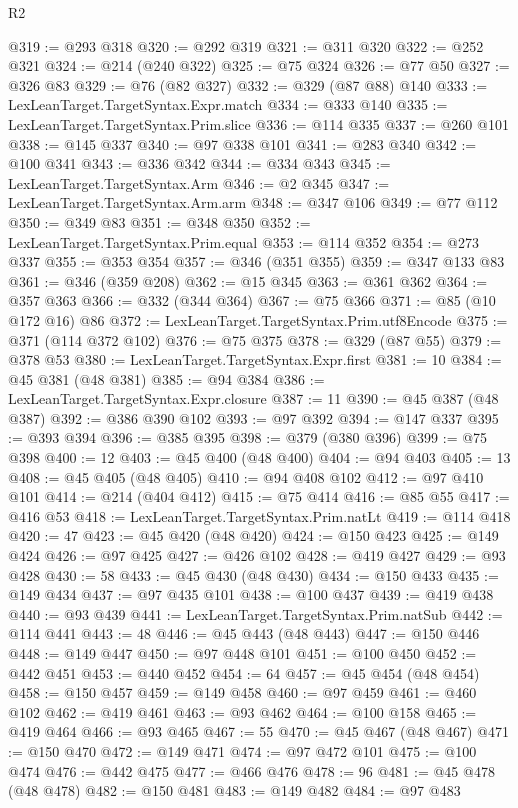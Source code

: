 \begin{lexlean}{R2}
\begin{coremodule}
@319 := @293 @318
@320 := @292 @319
@321 := @311 @320
@322 := @252 @321
@324 := @214 (@240 @322)
@325 := @75 @324
@326 := @77 @50
@327 := @326 @83
@329 := @76 (@82 @327)
@332 := @329 (@87 @88) @140
@333 := LexLeanTarget.TargetSyntax.Expr.match
@334 := @333 @140
@335 := LexLeanTarget.TargetSyntax.Prim.slice
@336 := @114 @335
@337 := @260 @101
@338 := @145 @337
@340 := @97 @338 @101
@341 := @283 @340
@342 := @100 @341
@343 := @336 @342
@344 := @334 @343
@345 := LexLeanTarget.TargetSyntax.Arm
@346 := @2 @345
@347 := LexLeanTarget.TargetSyntax.Arm.arm
@348 := @347 @106
@349 := @77 @112
@350 := @349 @83
@351 := @348 @350
@352 := LexLeanTarget.TargetSyntax.Prim.equal
@353 := @114 @352
@354 := @273 @337
@355 := @353 @354
@357 := @346 (@351 @355)
@359 := @347 @133 @83
@361 := @346 (@359 @208)
@362 := @15 @345
@363 := @361 @362
@364 := @357 @363
@366 := @332 (@344 @364)
@367 := @75 @366
@371 := @85 (@10 @172 @16) @86
@372 := LexLeanTarget.TargetSyntax.Prim.utf8Encode
@375 := @371 (@114 @372 @102)
@376 := @75 @375
@378 := @329 (@87 @55)
@379 := @378 @53
@380 := LexLeanTarget.TargetSyntax.Expr.first
@381 := 10
@384 := @45 @381 (@48 @381)
@385 := @94 @384
@386 := LexLeanTarget.TargetSyntax.Expr.closure
@387 := 11
@390 := @45 @387 (@48 @387)
@392 := @386 @390 @102
@393 := @97 @392
@394 := @147 @337
@395 := @393 @394
@396 := @385 @395
@398 := @379 (@380 @396)
@399 := @75 @398
@400 := 12
@403 := @45 @400 (@48 @400)
@404 := @94 @403
@405 := 13
@408 := @45 @405 (@48 @405)
@410 := @94 @408 @102
@412 := @97 @410 @101
@414 := @214 (@404 @412)
@415 := @75 @414
@416 := @85 @55
@417 := @416 @53
@418 := LexLeanTarget.TargetSyntax.Prim.natLt
@419 := @114 @418
@420 := 47
@423 := @45 @420 (@48 @420)
@424 := @150 @423
@425 := @149 @424
@426 := @97 @425
@427 := @426 @102
@428 := @419 @427
@429 := @93 @428
@430 := 58
@433 := @45 @430 (@48 @430)
@434 := @150 @433
@435 := @149 @434
@437 := @97 @435 @101
@438 := @100 @437
@439 := @419 @438
@440 := @93 @439
@441 := LexLeanTarget.TargetSyntax.Prim.natSub
@442 := @114 @441
@443 := 48
@446 := @45 @443 (@48 @443)
@447 := @150 @446
@448 := @149 @447
@450 := @97 @448 @101
@451 := @100 @450
@452 := @442 @451
@453 := @440 @452
@454 := 64
@457 := @45 @454 (@48 @454)
@458 := @150 @457
@459 := @149 @458
@460 := @97 @459
@461 := @460 @102
@462 := @419 @461
@463 := @93 @462
@464 := @100 @158
@465 := @419 @464
@466 := @93 @465
@467 := 55
@470 := @45 @467 (@48 @467)
@471 := @150 @470
@472 := @149 @471
@474 := @97 @472 @101
@475 := @100 @474
@476 := @442 @475
@477 := @466 @476
@478 := 96
@481 := @45 @478 (@48 @478)
@482 := @150 @481
@483 := @149 @482
@484 := @97 @483

\end{coremodule}
\end{lexlean}
